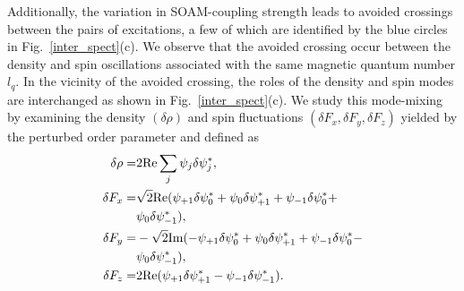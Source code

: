 \documentclass[pra,twocolumn,aps,superscriptaddress,showpacs,longbibliography]{revtex4-1}
\begin{document}
Additionally, the variation in SOAM-coupling strength leads to avoided crossings between the pairs of excitations,
a few of which are identified by the blue circles in Fig.~\ref{inter_spect}(c). We observe that the avoided crossing
occur between the density and spin oscillations associated with the same magnetic quantum number $l_q$. In the vicinity of the avoided crossing, the roles of 
the density and spin modes are interchanged as shown in Fig.~\ref{inter_spect}(c).  We study this mode-mixing by examining the density $(\delta \rho)$  and spin fluctuations $(\delta F_x, \delta F_y, \delta F_z)$ yielded by the perturbed order parameter and defined as 
\begin{subequations}
\begin{align}
\delta \rho=&2 {\rm Re} \sum_j \psi_j \delta \psi_j^*,\\
\delta F_x =& \sqrt{2} {\rm Re}(\psi_{+1}\delta \psi_0^*+
\psi_0\delta \psi_{+1}^* 
+\psi_{-1}\delta \psi_0^* +\nonumber\\&
\psi_0 \delta \psi_{-1}^*),\\
\delta F_y =& -\sqrt{2} {\rm Im}( -\psi_{+1} \delta \psi_0^*+
\psi_0\delta \psi_{+1}^* 
+\psi_{-1}\delta \psi_0^* -\nonumber\\&
\psi_0\delta \psi_{-1}^*) ,\\
\delta F_z =& 2{\rm Re}(\psi_{+1} \delta \psi_{+1}^*-
\psi_{-1}\delta \psi_{-1}^*).
\end{align}
\end{subequations}
\end{document}
